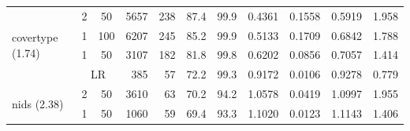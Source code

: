 \begin{tabular}{l ccr rrrrrrr}
		
  \midrule\multirow{4}{*}{covertype (1.74)} &                  2 & 50 &  5657 & 238 &  87.4 & 99.9 & 0.4361 &  0.1558 & 0.5919 & 1.958 \\
                                            &                 1 & 100 &  6207 & 245 &  85.2 & 99.9 & 0.5133 &  0.1709 & 0.6842 & 1.788 \\
                                            &                  1 & 50 &  3107 & 182 &  81.8 & 99.8 & 0.6202 &  0.0856 & 0.7057 & 1.414 \\
                                            &  \multicolumn{2}{c}{LR} &   385 &  57 &  72.2 & 99.3 & 0.9172 &  0.0106 & 0.9278 & 0.779 \\
       \midrule\multirow{4}{*}{nids (2.38)} &                  2 & 50 &  3610 &  63 &  70.2 & 94.2 & 1.0578 &  0.0419 & 1.0997 & 1.955 \\
                                            &                  1 & 50 &  1060 &  59 &  69.4 & 93.3 & 1.1020 &  0.0123 & 1.1143 & 1.406 \\

\end{tabular}
